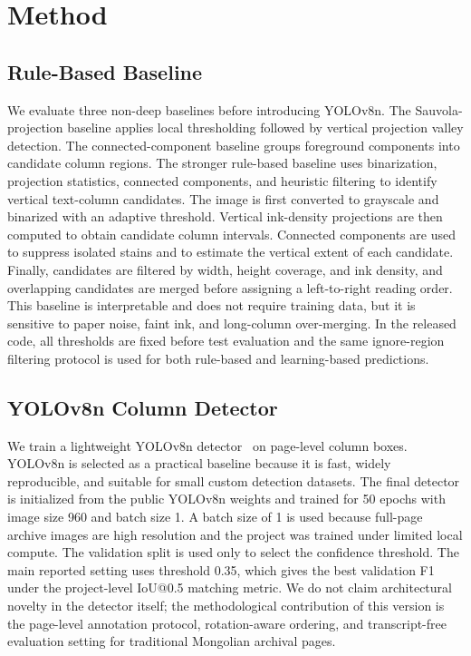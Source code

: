 \documentclass[12pt]{article}
\begin{document}
\section{Method}
\subsection{Rule-Based Baseline}
We evaluate three non-deep baselines before introducing YOLOv8n. The Sauvola-projection baseline applies local thresholding followed by vertical projection valley detection. The connected-component baseline groups foreground components into candidate column regions. The stronger rule-based baseline uses binarization, projection statistics, connected components, and heuristic filtering to identify vertical text-column candidates. The image is first converted to grayscale and binarized with an adaptive threshold. Vertical ink-density projections are then computed to obtain candidate column intervals. Connected components are used to suppress isolated stains and to estimate the vertical extent of each candidate. Finally, candidates are filtered by width, height coverage, and ink density, and overlapping candidates are merged before assigning a left-to-right reading order. This baseline is interpretable and does not require training data, but it is sensitive to paper noise, faint ink, and long-column over-merging. In the released code, all thresholds are fixed before test evaluation and the same ignore-region filtering protocol is used for both rule-based and learning-based predictions.

\subsection{YOLOv8n Column Detector}
We train a lightweight YOLOv8n detector~\cite{jocher2023yolov8} on page-level column boxes. YOLOv8n is selected as a practical baseline because it is fast, widely reproducible, and suitable for small custom detection datasets. The final detector is initialized from the public YOLOv8n weights and trained for 50 epochs with image size 960 and batch size 1. A batch size of 1 is used because full-page archive images are high resolution and the project was trained under limited local compute. The validation split is used only to select the confidence threshold. The main reported setting uses threshold 0.35, which gives the best validation F1 under the project-level IoU@0.5 matching metric. We do not claim architectural novelty in the detector itself; the methodological contribution of this version is the page-level annotation protocol, rotation-aware ordering, and transcript-free evaluation setting for traditional Mongolian archival pages.
\end{document}
